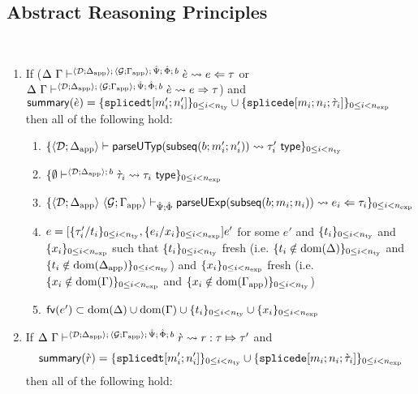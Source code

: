 \subsection{Abstract Reasoning Principles}
\begin{lemma} 
\label{thm:proto-expression-expansion-decomposition-B} ~
\begin{enumerate}
\item If ($\Delta~\Gamma \vdash^{\langle \mathcal{D}; \Delta_\text{app} \rangle;\,\langle \mathcal{G}; \Gamma_\text{app} \rangle;\,\hat{\Psi};\,\hat\Phi;\,b
  } \grave{e} \leadsto e \Leftarrow \tau$ or $\Delta~\Gamma \vdash^{\langle \mathcal{D}; \Delta_\text{app} \rangle;\,\langle \mathcal{G}; \Gamma_\text{app} \rangle;\,\hat{\Psi};\,\hat\Phi;\,b
  } \grave{e} \leadsto e \Rightarrow \tau$) and $\mathsf{summary}(\grave{e}) = \{\texttt{splicedt}[m'_i; n'_i]\}_{0 \leq i < n_\text{ty}} \cup \{\texttt{splicede}[m_i; n_i; \grave{\tau}_i]\}_{0 \leq i < n_\text{exp}}$ then all of the following hold:
  \begin{enumerate}
    \item $\{
          \langle \mathcal{D}; \Delta_\text{app} \rangle \vdash 
            \mathsf{parseUTyp}(\mathsf{subseq}(b; m'_i; n'_i))
           \leadsto \tau'_i~\mathsf{type}
        \}_{0 \leq i < n_\text{ty}}$
    \item $\{
      \emptyset\vdash^{
        \langle \mathcal{D}; \Delta_\text{app} \rangle
          ;\,b
      } 
        \grave{\tau}_i
       \leadsto \tau_i~\mathsf{type}
    \}_{0 \leq i < n_\text{exp}}$
    \item $\{
      \langle \mathcal{D}; \Delta_\text{app} \rangle~\langle \mathcal{G}; \Gamma_\text{app} \rangle \vdash_{\hat{\Psi}; \hat\Phi} \mathsf{parseUExp}(\mathsf{subseq}(b; m_i; n_i)) \leadsto e_i \Leftarrow \tau_i
    \}_{0 \leq i < n_\text{exp}}$
    \item $e = [\{\tau'_i/t_i\}_{0 \leq i < n_\text{ty}}, \{e_i/x_i\}_{0 \leq i < n_\text{exp}}]e'$ for some $e'$ and $\{t_i\}_{0 \leq i < n_\text{ty}}$ and $\{x_i\}_{0 \leq i < n_\text{exp}}$ such that $\{t_i\}_{0 \leq i < n_\text{ty}}$ fresh (i.e.  $\{t_i \notin \text{dom}(\Delta)\}_{0 \leq i < n_\text{ty}}$ and $\{t_i \notin \text{dom}(\Delta_\text{app})\}_{0 \leq i < n_\text{ty}}$) and $\{x_i\}_{0 \leq i < n_\text{exp}}$ fresh (i.e.  $\{x_i \notin \text{dom}(\Gamma)\}_{0 \leq i < n_\text{exp}}$ and $\{x_i \notin \text{dom}(\Gamma_\text{app})\}_{0 \leq i < n_\text{ty}}$)
    \item $\mathsf{fv}(e') \subset \text{dom}(\Delta) \cup \text{dom}(\Gamma) \cup \{t_i\}_{0 \leq i < n_\text{ty}} \cup \{x_i\}_{0 \leq i < n_\text{exp}}$
  \end{enumerate}
\item If $\Delta~\Gamma \vdash^{\langle \mathcal{D}; \Delta_\text{app} \rangle;\,\langle \mathcal{G}; \Gamma_\text{app} \rangle;\,\hat{\Psi};\,\hat\Phi;\,b} \grave{r} \leadsto r : \tau \Mapsto \tau'$ and \[\mathsf{summary}(\grave{r}) = \{\texttt{splicedt}[m'_i; n'_i]\}_{0 \leq i < n_\text{ty}} \cup \{\texttt{splicede}[m_i; n_i; \grave{\tau}_i]\}_{0 \leq i < n_\text{exp}}\] then all of the following hold:

\end{enumerate}
\end{lemma}
